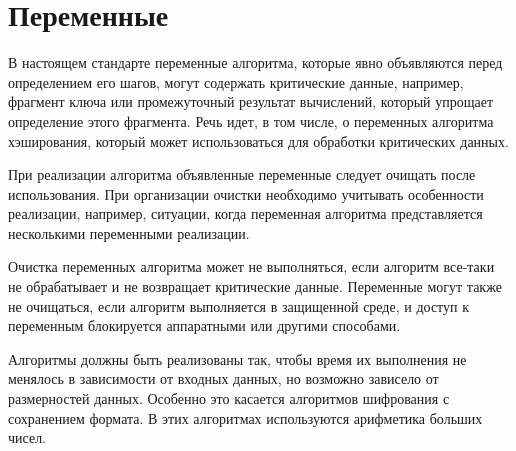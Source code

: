 \section{Переменные}\label{COMMON.Vars}

В настоящем стандарте переменные алгоритма, которые явно объявляются перед 
определением его шагов, могут содержать критические данные, например, фрагмент 
ключа или промежуточный результат вычислений, который упрощает определение 
этого фрагмента.
%
Речь идет, в том числе, о переменных алгоритма хэширования, 
который может использоваться для обработки критических данных.

При реализации алгоритма объявленные переменные следует очищать после
использования. При организации очистки необходимо учитывать особенности
реализации, например, ситуации, когда переменная алгоритма представляется
несколькими переменными реализации.

Очистка переменных алгоритма может не выполняться, если алгоритм все-таки 
не обрабатывает и не возвращает критические данные.
%
Переменные могут также не очищаться, если алгоритм выполняется в защищенной 
среде, и доступ к переменным блокируется аппаратными или другими способами.

Алгоритмы должны быть реализованы так, чтобы время их выполнения не 
менялось в зависимости от входных данных, но возможно зависело от 
размерностей данных. Особенно это касается алгоритмов шифрования с 
сохранением формата. В этих алгоритмах используются арифметика больших 
чисел.
\fi
